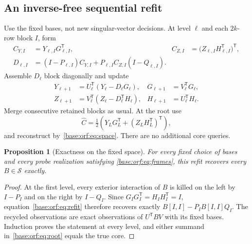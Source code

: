 \documentclass[11pt,oneside,openany,a4paper]{book}
\numberwithin{equation}{chapter}
\newtheorem{proposition}[theorem]{Proposition}
\theoremstyle{definition}
\theoremstyle{remark}
\newcommand{\T}{\mathsf T}\newcommand{\Id}{I}
\begin{document}
\subsection{An inverse-free sequential refit}
Use the fixed bases, not new singular-vector decisions. At level $\ell$
and each $2k$-row block $I$, form
\begin{align}
 C_{Y,I}&=Y_{\ell,I}G_{\ell,I}^{\T},&
 C_{Z,I}&=\bigl(Z_{\ell,I}H_{\ell,I}^{\T}\bigr)^{\T},\nonumber\\
 D_{\ell,I}&=(I-P_{\ell,I})C_{Y,I}
       +P_{\ell,I}C_{Z,I}(I-Q_{\ell,I}).\label{base:orf:eq:refit}
\end{align}
Assemble $D_\ell$ block diagonally and update
\begin{align}
 Y_{\ell+1}&=U_\ell^{\T}(Y_\ell-D_\ell G_\ell),&
 G_{\ell+1}&=V_\ell^{\T}G_\ell,\nonumber\\
 Z_{\ell+1}&=V_\ell^{\T}(Z_\ell-D_\ell^{\T}H_\ell),&
 H_{\ell+1}&=U_\ell^{\T}H_\ell.\label{base:orf:eq:transport}
\end{align}
Merge consecutive retained blocks as usual. At the root use
\begin{equation}\label{base:orf:eq:root}
 \widehat C=\tfrac12\left(Y_LG_L^{\T}
                  +(Z_LH_L^{\T})^{\T}\right),
\end{equation}
and reconstruct by~\eqref{base:orf:eq:space}. There are no additional core queries.

\begin{proposition}[Exactness on the fixed space]\label{base:orf:prop:exact}
For every fixed choice of bases and every probe realization satisfying
\eqref{base:orf:eq:frames}, this refit recovers every $B\in\mathcal S$ exactly.
\end{proposition}
\begin{proof}
At the first level, every exterior interaction of $B$ is killed on the
left by $I-P_I$ and on the right by $I-Q_I$. Since
$G_IG_I^{\T}=H_IH_I^{\T}=I$, equation~\eqref{base:orf:eq:refit} therefore recovers
exactly $B[I,I]-P_IB[I,I]Q_I$. The recycled observations are exact
observations of $U^{\T}BV$ with its fixed bases. Induction proves the
statement at every level, and either summand in~\eqref{base:orf:eq:root} equals
the true core.
\end{proof}
\end{document}
